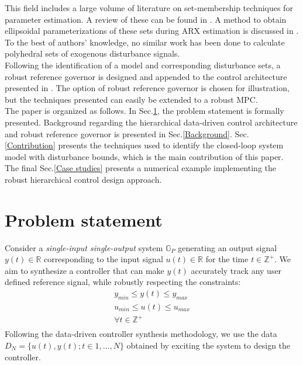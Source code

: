 \documentclass[letterpaper, 10 pt, conference]{ieeeconf}  %
\begin{document}
This field includes a large volume of literature on set-membership techniques for parameter estimation. A review of these can be found in \cite{WALTER1990449}. A method to obtain ellipsoidal parameterizations of these sets during ARX estimation is discussed in \cite{7330793}. To the best of authors' knowledge, no similar work has been done to calculate polyhedral sets of exogenous disturbance signals.
 \\ \indent
  Following the identification of a model and corresponding disturbance sets, a robust reference governor is designed and appended to the control architecture presented in \cite{7932940}.
 The option of robust reference governor is chosen for illustration, but the techniques presented can easily be extended to a robust MPC.
 \\ \indent
 The paper is organized as follows. In Sec.\ref{Problem statement}, the problem statement is formally presented. Background regarding the hierarchical data-driven control architecture and robust reference governor is presented in Sec.\ref{Background}. Sec.\ref{Contribution} presents the techniques used to identify the closed-loop system model with disturbance bounds, which is the main contribution of this paper. The final Sec.\ref{Case studies} presents a numerical example implementing the robust hierarchical control design approach. 

\section{Problem statement}
\label{Problem statement}
Consider a \textit{single-input single-output} system $\mathbb{G}_P$ generating an output signal $y(t) \in \mathbb{R}$ corresponding to the input signal $u(t) \in \mathbb{R}$ for the time $t \in \mathbb{Z}^+$. We aim to synthesize a controller that can make $y(t)$ accurately track any user defined reference signal, while robustly respecting the constraints:
\begin{equation} 
\begin{matrix}
y_{min}\leq y(t) \leq y_{max}\\
u_{min}\leq u(t) \leq u_{max} \\
\forall t \in \mathbb{Z}^+\\
\end{matrix}
\label{constraints}
\end{equation} 
Following the data-driven controller synthesis methodology, we use the data $D_{N}=\{u(t),y(t);t\in{1,...,N}\}$ obtained by exciting the system to design the controller.
\end{document}
